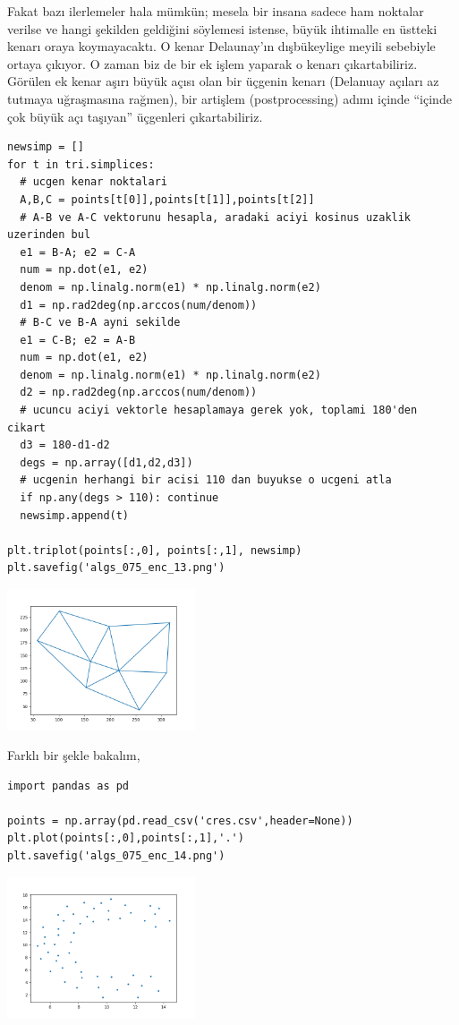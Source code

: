 \documentclass[12pt,fleqn]{article}\usepackage{../../common}
\begin{document}
Fakat bazı ilerlemeler hala mümkün; mesela bir insana sadece ham noktalar
verilse ve hangi şekilden geldiğini söylemesi istense, büyük ihtimalle en
üstteki kenarı oraya koymayacaktı. O kenar Delaunay'ın dışbükeylige meyili
sebebiyle ortaya çıkıyor. O zaman biz de bir ek işlem yaparak o kenarı
çıkartabiliriz. Görülen ek kenar aşırı büyük açısı olan bir üçgenin kenarı
(Delanuay açıları az tutmaya uğraşmasına rağmen), bir artişlem (postprocessing)
adımı içinde ``içinde çok büyük açı taşıyan'' üçgenleri çıkartabiliriz.

\begin{verbatim}
newsimp = []
for t in tri.simplices:
  # ucgen kenar noktalari
  A,B,C = points[t[0]],points[t[1]],points[t[2]]
  # A-B ve A-C vektorunu hesapla, aradaki aciyi kosinus uzaklik uzerinden bul
  e1 = B-A; e2 = C-A
  num = np.dot(e1, e2)
  denom = np.linalg.norm(e1) * np.linalg.norm(e2)
  d1 = np.rad2deg(np.arccos(num/denom))
  # B-C ve B-A ayni sekilde
  e1 = C-B; e2 = A-B
  num = np.dot(e1, e2)
  denom = np.linalg.norm(e1) * np.linalg.norm(e2)
  d2 = np.rad2deg(np.arccos(num/denom))
  # ucuncu aciyi vektorle hesaplamaya gerek yok, toplami 180'den cikart
  d3 = 180-d1-d2
  degs = np.array([d1,d2,d3])
  # ucgenin herhangi bir acisi 110 dan buyukse o ucgeni atla
  if np.any(degs > 110): continue
  newsimp.append(t)

plt.triplot(points[:,0], points[:,1], newsimp)
plt.savefig('algs_075_enc_13.png')
\end{verbatim}

\includegraphics[width=15em]{algs_075_enc_13.png}

Farklı bir şekle bakalım,

\begin{verbatim}
import pandas as pd

points = np.array(pd.read_csv('cres.csv',header=None))
plt.plot(points[:,0],points[:,1],'.')
plt.savefig('algs_075_enc_14.png')
\end{verbatim}

\includegraphics[width=15em]{algs_075_enc_14.png}
\end{document}
